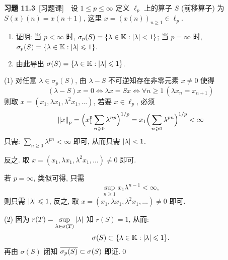 	\textbf{习题 11.3}\ [习题课]\ \ 设 $ 1\leqslant p\leqslant\infty $ 定义 $ \ell_{p} $ 上的算子 $ S $ (前移算子) 为 $ S(x)(n)=x(n+1) $, 这里 $ x=(x(n))_{n\geqslant1}\in\ell_{p} $.
	\begin{enumerate}[(1)]
		\item 证明: 当 $ p<\infty $ 时, $ \sigma_{p}(S)=\{ \lambda\in\K:\abs{\lambda}<1 \} $; 当 $ p=\infty $ 时, $ \sigma_{p}(S)=\{ \lambda\in\K:\abs{\lambda}\leqslant1 \} $.
		\item 由此导出 $ \sigma(S)=\{ \lambda\in\K:\abs{\lambda}\leqslant1 \} $.
	\end{enumerate}
	\begin{Proof}
		(1) 对任意 $ \lambda\in\sigma_{p}(S) $, 由 $ \lambda-S $ 不可逆知存在非零元素 $ x\ne 0 $ 使得
		\[
			(\lambda-S)x=0\Longleftrightarrow \lambda x=Sx\Longleftrightarrow \forall n\geqslant1\,(\lambda x_{n}=x_{n+1})
		\]
		则取 $ x=(x_{1}, \lambda x_{1}, \lambda^{2}x_{1}, \dots) $, 若要 $ x\in\ell_{p} $, 必须
		\[
			\norm{x}_{p}=\Big( x_{1}^{p}\sum_{n\geqslant0}\lambda^{np} \Big)^{1/p}=x_{1}\Big( \sum_{n\geqslant0}\lambda^{pn} \Big)^{1/p}<\infty
		\]
		只需: $ \sum\limits_{n\geqslant0}\lambda^{pn}<\infty $ 即可, 从而只需 $ \abs{\lambda}<1 $.

		反之. 取 $ x=(x_{1}, \lambda x_{1}, \lambda^{2}x_{1}, \dots)\ne0 $ 即可.

		若 $ p=\infty $, 类似可得, 只需
		\[
			\sup_{n\geqslant1}x_{1}\lambda^{n-1}<\infty,
		\]
		则只需 $ \abs{\lambda}\leqslant1 $, 反之, 取 $ x=(x_{1}, \lambda x_{1}, \lambda^{2}x_{1}, \dots)\ne 0 $ 即可.

		(2) 因为 $ r(T)=\sup\limits_{\lambda\in\sigma(T)}\abs{\lambda} $ 知 $ r(S)=1 $, 从而:
		\[
			\sigma(S)\subset\{ \lambda\in\K:\abs{\lambda}\leqslant1 \}.
		\]
		再由 $ \sigma(S) $ 闭知 $ \baro{\sigma_{p}(S)}\subset\sigma(S) $ 即证.\qed
	\end{Proof}

